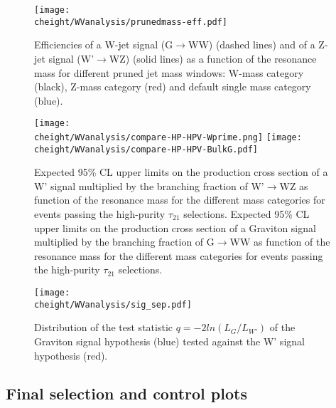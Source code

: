 \begin{figure}[htbp]
 \centering
 \texttt{[image: \\cheight/WVanalysis/prunedmass-eff.pdf]}
 \caption{Efficiencies of a W-jet signal (G$\rightarrow$WW) (dashed lines) and of a Z-jet signal (W'$\rightarrow$WZ) (solid lines) as a function of the resonance mass for different pruned jet mass windows: W-mass category (black), Z-mass category (red) and default single mass category (blue).}
 \label{fig:massCategories_efficiency}
 \end{figure}
  
  \begin{figure}[htbp]
 \centering
 \texttt{[image: \\cheight/WVanalysis/compare-HP-HPV-Wprime.png]}
  \texttt{[image: \\cheight/WVanalysis/compare-HP-HPV-BulkG.pdf]} 
 \caption{Expected 95\% CL upper limits on the production cross section of a W' signal multiplied by the branching fraction of W'$\rightarrow$WZ as function of the resonance mass for the different mass categories for events passing the high-purity $\tau_{21}$ selections. Expected 95\% CL upper limits on the production cross section of a Graviton signal multiplied by the branching fraction of G$\rightarrow$WW as function of the resonance mass for the different mass categories for events passing the high-purity $\tau_{21}$ selections.}
 \label{fig:massCategories_limitsWp}
 \end{figure}

\begin{figure}[htbp]
 \centering
 \texttt{[image: \\cheight/WVanalysis/sig\_sep.pdf]}
 \caption{Distribution of the test statistic $q = -2ln(L_{G}/L_{W'})$ of the Graviton signal hypothesis (blue) tested against the W' signal hypothesis (red). }
 \label{fig:signalsep}
 \end{figure}
 
\subsection{Final selection and control plots}

